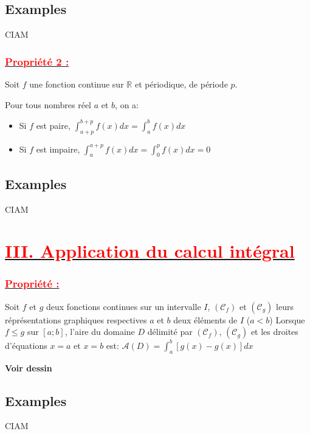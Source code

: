 \documentclass[12pt]{article}
\begin{document}
\subsection*{Examples}
CIAM
\subsubsection*{\underline{\textcolor{red}{Propriété 2 :}}}
Soit \(f\) une fonction continue sur \( \mathbb{R} \) et périodique, de période \(p\).

Pour tous nombres réel \(a\) et \(b\), on a:

\begin{itemize}
    \item Si \(f\) est paire, \( \int_{a+p}^{b+p}f(x)dx = \int_{a}^{b}f(x)dx \)
    \item Si \(f\) est impaire, \( \int_{a}^{a+p}f(x)dx =  \int_{0}^{p}f(x)dx = 0 \)
\end{itemize}
\subsection*{Examples}
CIAM
\section*{\underline{\textbf{\textcolor{red}{III. Application du calcul intégral}}}}
\subsubsection*{\underline{\textcolor{red}{Propriété :}}}
Soit \(f\) et \(g\) deux fonctions continues sur un intervalle \(I\), \( (\mathcal{C}_f) \) et \( (\mathcal{C}_g) \) leurs réprésentations graphiques respectives \(a\) et \(b\) deux éléments de \(I\) (\(a<b\))
Lorsque \(f \leq g\) sur \( [a;b] \), l'aire du domaine \(D\) délimité par \( (\mathcal{C}_f) \), \( (\mathcal{C}_g) \) et les droites d'équations \( x=a \) et \( x=b \) est: \(\mathcal{A}(D)=\int_{a}^{b} [g(x)-g(x)]dx \)

\textbf{Voir dessin}
\subsection*{Examples}
CIAM
\end{document}
